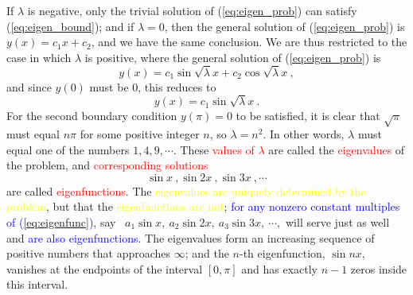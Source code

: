 \documentclass[12pt,a4paper]{article}
\begin{document}
If $\lambda$ is negative, only the trivial solution of (\ref{eq:eigen_prob}) can satisfy (\ref{eq:eigen_bound}); and if $\lambda = 0$, then the general solution of (\ref{eq:eigen_prob}) is $y(x)=c_1 x+ c_2$, and we have the same conclusion. We are thus restricted to the case in which $\lambda$ is positive, where the general solution of (\ref{eq:eigen_prob}) is
\begin{equation*}
y(x) = c_1 \sin \sqrt{\lambda} x + c_2 \cos \sqrt{\lambda} x  ~,
\end{equation*}
and since $y(0)$ must be $0$, this reduces to
\begin{equation}
y(x) = c_1 \sin \sqrt{\lambda} x ~.
\end{equation}
For the second boundary condition $y(\pi)=0$ to be satisfied, it is clear that $\sqrt{\pi}$ must equal $n\pi$ for some positive integer $n$, so $\lambda =n^2$. In other words, $\lambda$ must equal one of the numbers $1, 4, 9, \cdots$. These \textcolor{red}{values of $\lambda$} are called the \textcolor{red}{eigenvalues} of the problem, and \textcolor{red}{corresponding solutions}
\begin{equation}
\sin x ~, \sin 2x ~, \sin 3x ~, \cdots 
\label{eq:eigenfunc}
\end{equation}
are called \textcolor{red}{eigenfunctions}. The \textcolor{yellow}{eigenvalues are uniquely determined by the problem}, but that the \textcolor{yellow}{eigenfunctions are not}; \textcolor{blue}{for any nonzero constant multiples of (\ref{eq:eigenfunc})}, say ~$a_1 \sin x, ~a_2 \sin 2x, ~a_3 \sin 3x, ~\cdots,$ will serve just as well and \textcolor{blue}{are also eigenfunctions}.  The eigenvalues form an increasing sequence of positive numbers that
approaches $\infty$; and the $n$-th eigenfunction, $\sin nx$, vanishes at the endpoints of the interval $[0, \pi]$ and has exactly $n - 1$ zeros inside this interval.
\end{document}
